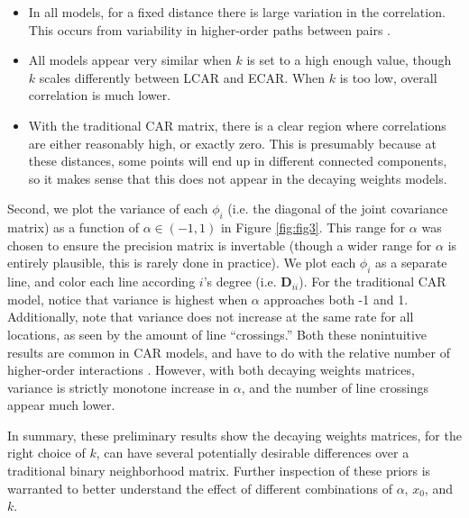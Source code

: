 \documentclass{scrartcl}
\newcommand{\mat}[1]{\bm{#1}}
\begin{document}
\begin{itemize}
\item In all models, for a fixed distance there is large variation in
  the correlation. This occurs from variability in higher-order paths
  between pairs \cite{Assuncao2009}.
\item All models appear very similar when $k$ is set to a high enough
  value, though $k$ scales differently between LCAR and ECAR. When $k$
  is too low, overall correlation is much lower.
\item With the traditional CAR matrix, there is a clear region where
  correlations are either reasonably high, or exactly zero. This is
  presumably because at these distances, some points will end up in
  different connected components, so it makes sense that this does not
  appear in the decaying weights models.
\end{itemize}

Second, we plot the variance of each $\phi_i$ (i.e. the diagonal of
the joint covariance matrix) as a function of $\alpha\in(-1, 1)$ in
Figure \ref{fig:fig3}. This range for $\alpha$ was chosen to ensure
the precision matrix is invertable (though a wider range for $\alpha$
is entirely plausible, this is rarely done in practice). We plot each
$\phi_i$ as a separate line, and color each line according $i$'s
degree (i.e. $\mat{D}_{ii}$). For the traditional CAR model, notice
that variance is highest when $\alpha$ approaches both -1 and
1. Additionally, note that variance does not increase at the same rate
for all locations, as seen by the amount of line ``crossings.'' Both
these nonintuitive results are common in CAR models, and have to do
with the relative number of higher-order interactions
\cite{Assuncao2009}. However, with both decaying weights matrices,
variance is strictly monotone increase in $\alpha$, and the number of
line crossings appear much lower.

In summary, these preliminary results show the decaying weights
matrices, for the right choice of $k$, can have several potentially
desirable differences over a traditional binary neighborhood
matrix. Further inspection of these priors is warranted to better
understand the effect of different combinations of $\alpha$, $x_0$,
and $k$.
\end{document}
